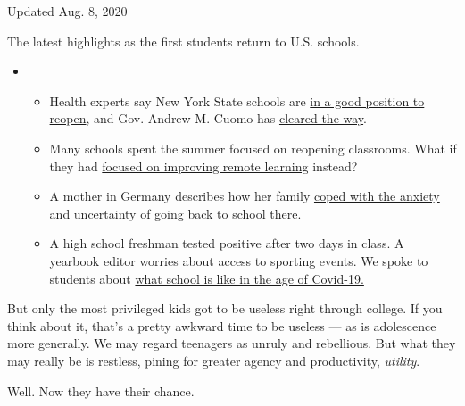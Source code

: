 Updated Aug. 8, 2020

The latest highlights as the first students return to U.S. schools.

\begin{itemize}
\item
  \begin{itemize}
  \tightlist
  \item
    Health experts say New York State schools are
    \href{https://www.nytimes.com/2020/08/07/health/coronavirus-ny-schools-reopen.html?action=click\&pgtype=Article\&state=default\&region=MAIN_CONTENT_2\&context=storylines_keepup}{in
    a good position to reopen}, and Gov. Andrew M. Cuomo has
    \href{https://www.nytimes.com/2020/08/07/nyregion/cuomo-schools-reopening.html?action=click\&pgtype=Article\&state=default\&region=MAIN_CONTENT_2\&context=storylines_keepup}{cleared
    the way}.
  \item
    Many schools spent the summer focused on reopening classrooms. What
    if they had
    \href{https://www.nytimes.com/2020/08/07/us/remote-learning-fall-2020.html?action=click\&pgtype=Article\&state=default\&region=MAIN_CONTENT_2\&context=storylines_keepup}{focused
    on improving remote learning} instead?
  \item
    A mother in Germany describes how her family
    \href{https://www.nytimes.com/2020/08/07/parenting/germany-schools-reopening-children.html?action=click\&pgtype=Article\&state=default\&region=MAIN_CONTENT_2\&context=storylines_keepup}{coped
    with the anxiety and uncertainty} of going back to school there.
  \item
    A high school freshman tested positive after two days in class. A
    yearbook editor worries about access to sporting events. We spoke to
    students about
    \href{https://www.nytimes.com/2020/08/06/us/coronavirus-students.html?action=click\&pgtype=Article\&state=default\&region=MAIN_CONTENT_2\&context=storylines_keepup}{what
    school is like in the age of Covid-19.}
  \end{itemize}
\end{itemize}

But only the most privileged kids got to be useless right through
college. If you think about it, that's a pretty awkward time to be
useless --- as is adolescence more generally. We may regard teenagers as
unruly and rebellious. But what they may really be is restless, pining
for greater agency and productivity, \emph{utility}.

Well. Now they have their chance.

